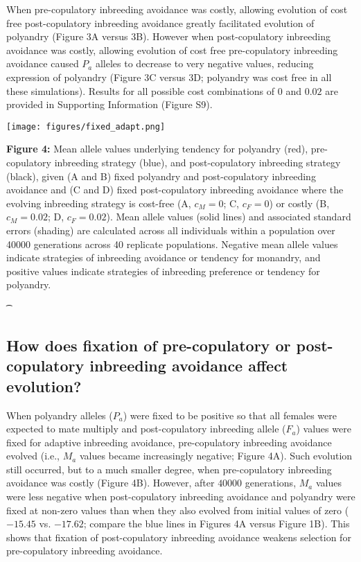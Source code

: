 \documentclass[10pt,letterpaper]{article}
\begin{document}
When pre-copulatory inbreeding avoidance was costly, allowing evolution of cost free post-copulatory inbreeding avoidance greatly facilitated evolution of polyandry (Figure 3A versus 3B). However when post-copulatory inbreeding avoidance was costly, allowing evolution of cost free pre-copulatory inbreeding avoidance caused $P_{a}$ alleles to decrease to very negative values, reducing expression of polyandry (Figure 3C versus 3D; polyandry was cost free in all these simulations). Results for all possible cost combinations of $0$ and $0.02$ are provided in Supporting Information (Figure S9).

{\color{Gray}
\begin{adjustwidth}{-2.2in}{0in}
{%
   \texttt{[image: figures/fixed\_adapt.png]}%
}
{%
   \begin{justify}\vspace{0.25 mm} \textbf{Figure 4:} Mean allele values underlying tendency for polyandry (red), pre-copulatory inbreeding strategy (blue), and post-copulatory inbreeding strategy (black), given (A and B) fixed polyandry and post-copulatory inbreeding avoidance and (C and D) fixed post-copulatory inbreeding avoidance where the evolving inbreeding strategy is cost-free (A, $c_{M} = 0$; C, $c_{F} = 0$) or costly (B, $c_{M}=0.02$; D, $c_{F}=0.02$). Mean allele values (solid lines) and associated standard errors (shading) are calculated across all individuals within a population over 40000 generations across 40 replicate populations. Negative mean allele values indicate strategies of inbreeding avoidance or tendency for monandry, and positive values indicate strategies of inbreeding preference or tendency for polyandry. \end{justify}{\t}%
}
\end{adjustwidth}
}


\subsection*{How does fixation of pre-copulatory or post-copulatory inbreeding avoidance affect evolution?}

When polyandry alleles ($P_{a}$) were fixed to be positive so that all females were expected to mate multiply and post-copulatory inbreeding allele ($F_{a}$) values were fixed for adaptive inbreeding avoidance, pre-copulatory inbreeding avoidance evolved (i.e., $M_{a}$ values became increasingly negative; Figure 4A). Such evolution still occurred, but to a much smaller degree, when pre-copulatory inbreeding avoidance was costly (Figure 4B). However, after $40000$ generations, $M_{a}$ values were less negative when post-copulatory inbreeding avoidance and polyandry were fixed at non-zero values than when they also evolved from initial values of zero ($-15.45$ vs. $-17.62$; compare the blue lines in Figures 4A versus Figure 1B). This shows that fixation of post-copulatory inbreeding avoidance weakens selection for pre-copulatory inbreeding avoidance.
\end{document}
